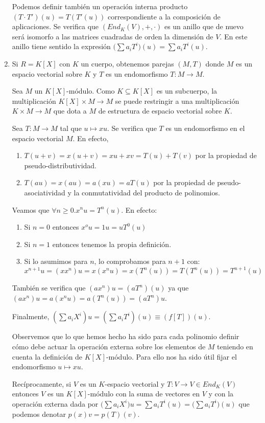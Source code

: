 \begin{example}
\begin{enumerate}
Podemos definir también un operación interna producto $(T \cdot T')(u) = T(T'(u))$ correspondiente a la composición de aplicaciones. Se verifica que $(End_K(V),+,\cdot)$ es un anillo que de nuevo será isomorfo a las matrices cuadradas de orden la dimensión de $V$. En este anillo tiene sentido la expresión $\Big(\sum a_iT^i\Big)(u) = \sum a_iT^i(u)$. 

\item Si $R = K[X]$ con $K$ un cuerpo, obtenemos parejas $(M,T)$ donde $M$ es un espacio vectorial sobre $K$ y $T$ es un endomorfismo $T:M \to M$. 

Sea $M$ un $K[X]$-módulo. Como $K \subseteq K[X]$ es un subcuerpo, la multiplicación $K[X] \times M \to M$ se puede restringir a una multiplicación $K \times M \to M$ que dota a $M$ de estructura de espacio vectorial sobre $K$. 

Sea $T:M \to M$ tal que $u \mapsto xu$. Se verifica que $T$ es un endomorfismo en el espacio vectorial $M$. En efecto, 

\begin{enumerate}
\item $T(u+v) = x(u+v) = xu+xv = T(u)+T(v)$ por la propiedad de pseudo-distributividad.

\item $T(au) = x(au) = a(xu) = aT(u)$ por la propiedad de pseudo-asociatividad y la conmutatividad del producto de polinomios. 
\end{enumerate}

Veamos que $\forall n \ge 0.x^nu = T^n(u)$. En efecto:

\begin{enumerate}
\item Si $n = 0$  entonces $x^ou = 1u = uT^0(u)$
\item Si $n = 1$ entonces tenemos la propia definición. 
\item Si lo asumimos para $n$, lo comprobamos para $n+1$ con: $$x^{n+1}u = (xx^n)u = x(x^nu) = x(T^n(u)) = T(T^n(u)) = T^{n+1}(u)$$
\end{enumerate}

También se verifica que $(ax^n)u = (aT^n)(u)$ ya que $(ax^n)u = a(x^nu) = a(T^n(u)) = (aT^n)u$. 

Finalmente, $(\sum a_iX^i)u = (\sum a_iT^i)(u) \equiv (f[T])(u)$. 

Observemos que lo que hemos hecho ha sido para cada polinomio definir cómo debe actuar la operación externa sobre los elementos de $M$ teniendo en cuenta la definición de $K[X]$-módulo. Para ello nos ha sido útil fijar el endomorfismo $u \mapsto xu$. 

Recíprocamente, si $V$ es un $K$-espacio vectorial y $T:V \to V \in End_K(V)$ entonces $V$ es un $K[X]$-módulo con la suma de vectores en $V$ y con la operación externa dada por $\Big(\sum a_iX^i\Big)u = \sum a_i T^i(u) = \Big(\sum a_iT^i \Big)(u)$ que podemos denotar $p(x)v = p(T)(v)$. 
\end{enumerate}
\end{example}

